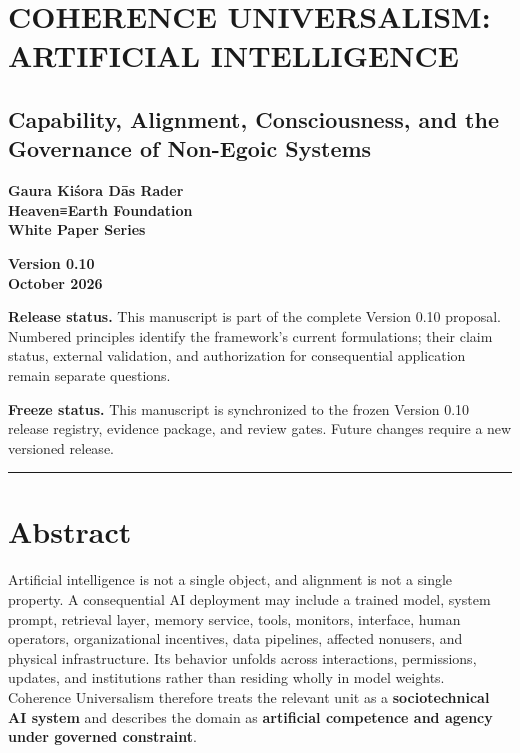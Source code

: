 \documentclass[
  11pt,
]{article}
\author{}
\date{}
\begin{document}
\section{COHERENCE UNIVERSALISM: ARTIFICIAL
INTELLIGENCE}\label{coherence-universalism-artificial-intelligence}

\subsection{Capability, Alignment, Consciousness, and the Governance of
Non-Egoic
Systems}\label{capability-alignment-consciousness-and-the-governance-of-non-egoic-systems}

\textbf{Gaura Kiśora Dās Rader}\\
\textbf{Heaven≡Earth Foundation}\\
\textbf{White Paper Series}

\textbf{Version 0.10}\\
\textbf{October 2026}

\textbf{Release status.} This manuscript is part of the complete Version
0.10 proposal. Numbered principles identify the framework's current
formulations; their claim status, external validation, and authorization
for consequential application remain separate questions.

\textbf{Freeze status.} This manuscript is synchronized to the frozen
Version 0.10 release registry, evidence package, and review gates.
Future changes require a new versioned release.

\begin{center}\rule{0.5\linewidth}{0.5pt}\end{center}

\section{Abstract}\label{abstract}

Artificial intelligence is not a single object, and alignment is not a
single property. A consequential AI deployment may include a trained
model, system prompt, retrieval layer, memory service, tools, monitors,
interface, human operators, organizational incentives, data pipelines,
affected nonusers, and physical infrastructure. Its behavior unfolds
across interactions, permissions, updates, and institutions rather than
residing wholly in model weights. Coherence Universalism therefore
treats the relevant unit as a \textbf{sociotechnical AI system} and
describes the domain as \textbf{artificial competence and agency under
governed constraint}.
\end{document}
